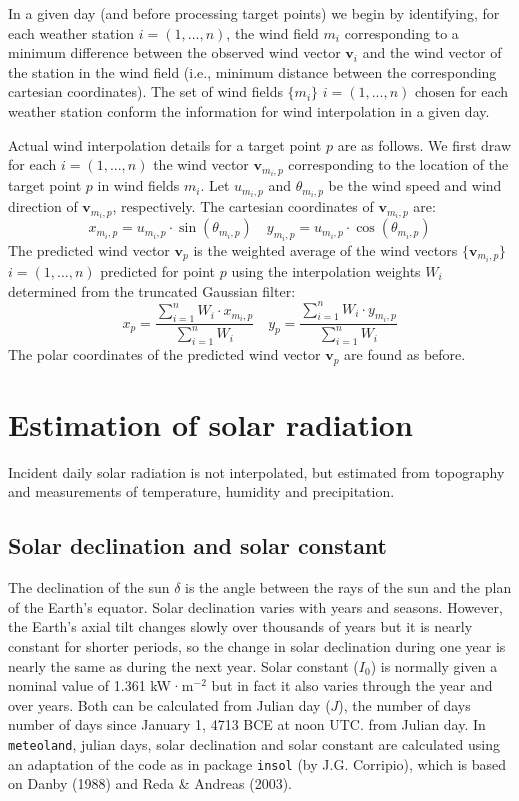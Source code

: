 \documentclass[11pt,a4paper]{article}
\begin{document}
In a given day (and before processing target points) we begin by identifying, for each weather station $i = (1, ... ,n)$, the wind field $m_i$ corresponding to a minimum difference between the observed wind vector $\mathbf{v}_i$ and the wind vector of the station in the wind field (i.e., minimum distance between the corresponding cartesian coordinates). The set of wind fields $\{m_i\}$ $i = (1, ... ,n)$ chosen for each weather station conform the information for wind interpolation in a given day.

Actual wind interpolation details for a target point $p$ are as follows. We first draw for each $i=(1,... , n)$ the wind vector $\mathbf{v}_{m_i,p}$ corresponding to the location of the target point $p$ in wind fields $m_i$. Let $u_{m_i,p}$ and $\theta_{m_i,p}$ be the wind speed and wind direction of $\mathbf{v}_{m_i,p}$, respectively. The cartesian coordinates of $\mathbf{v}_{m_i,p}$ are:
\begin{equation}
x_{m_i,p} = u_{m_i,p}\cdot \sin(\theta_{m_i,p}) \quad y_{m_i,p} = u_{m_i,p}\cdot \cos(\theta_{m_i,p})
\end{equation}
The predicted wind vector $\mathbf{v}_{p}$ is the weighted average of the wind vectors $\{\mathbf{v}_{m_i,p}\}$  $i=(1,... , n)$ predicted for point $p$ using the interpolation weights $W_i$ determined from the truncated Gaussian filter:
\begin{equation}
x_{p} = \frac{\sum_{i=1}^{n}{W_i \cdot x_{m_i,p}}}{\sum_{i=1}^{n}{W_i}}  \quad y_{p} = \frac{\sum_{i=1}^{n}{W_i \cdot y_{m_i,p}}}{\sum_{i=1}^{n}{W_i}}
\end{equation}
The polar coordinates of the predicted wind vector $\mathbf{v}_{p}$  are found as before.


\section{Estimation of solar radiation}
Incident daily solar radiation is not interpolated, but estimated from topography and measurements of temperature, humidity and precipitation.


\subsection{Solar declination and solar constant}
The declination of the sun $\delta$ is the angle between the rays of the sun and the plan of the Earth's equator. Solar declination varies with years and seasons. However, the Earth's axial tilt changes slowly over thousands of years but it is nearly constant for shorter periods, so the change in solar declination during one year is nearly the same as during the next year. Solar constant ($I_0$) is normally given a nominal value of 1.361 kW·m$^{-2}$ but in fact it also varies through the year and over years. Both can be calculated from Julian day ($J$), the number of days number of days since January 1, 4713 BCE at noon UTC. from Julian day. In \texttt{meteoland}, julian days, solar declination and solar constant are calculated using an adaptation of the code as in package \texttt{insol} (by J.G. Corripio), which is based on Danby (1988) and Reda \& Andreas (2003). 
\end{document}

